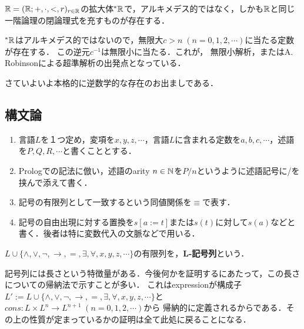 \documentclass[uplatex, 12pt, dvipdfmx]{jsreport}
\begin{document}
\begin{example}[代数的閉体]
    
\end{example}

\begin{example}[実数]
    \begin{proposition}[Compactness]
        $\mathbb{R}=(\mathbb{R};+,\cdot,<,r)_{r\in\mathbb{R}}$の拡大体${}^*\mathbb{R}$で，アルキメデス的ではなく，しかも$\mathbb{R}$と同じ一階論理の閉論理式を充すものが存在する．
    \end{proposition}
    \begin{remark}
        ${}^*\mathbb{R}$はアルキメデス的ではないので，無限大$c>n\;(n=0,1,2,\cdots)$に当たる定数が存在する．
        この逆元$c^{-1}$は無限小に当たる．これが，
        無限小解析，またはA. Robinsonによる超準解析の出発点となっている．
    \end{remark}
\end{example}

さていよいよ本格的に逆数学的な存在のお出ましである．

\begin{example}[実閉体]
    
\end{example}

\subsection{構文論}

\begin{notation}\mbox{}
    \begin{enumerate}
        \item 言語$L$を１つ定め，変項を$x,y,z,\cdots$，言語$L$に含まれる定数を$a,b,c,\cdots$，述語を$P,Q,R,\cdots$と書くこととする．
        \item Prologでの記法に倣い，述語のarity $n\in\mathbb{N}$を$P/n$というように述語記号に/を挟んで添えて書く．
        \item 記号の有限列として一致するという同値関係を$\equiv$で表す．
        \item 記号の自由出現に対する置換を$s[a:=t]$または$s(t)$に対して$s(a)$などと書く．後者は特に変数代入の文脈などで用いる．
    \end{enumerate}
\end{notation}

\begin{definition}[expression]
    $L\cup\{\land,\lor,\lnot,\to,=,\exists,\forall,x,y,z,\cdots\}$の有限列を，\textbf{L-記号列}という．
\end{definition}
\begin{remark}
    記号列には長さという特徴量がある．今後何かを証明するにあたって，この長さについての帰納法で示すことが多い．
    これはexpressionが構成子$L':=L\cup\{\land,\lor,\lnot,\to,=,\exists,\forall,x,y,z,\cdots\}$と$cons:L\times L^n\to L^{n+1}\;(n=0,1,2,\cdots)$から
    帰納的に定義されるからである．その上の性質が定まっているかの証明は全て此処に戻ることになる．
\end{remark}
\end{document}
